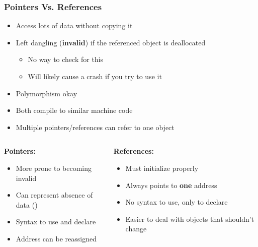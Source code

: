 \documentclass[glossy]{beamer}
\begin{document}
\begin{frame}[fragile=singleslide]
  \frametitle{Pointers Vs. References}

  \begin{itemize}
    \item Access lots of data without copying it
    \item Left dangling (\textbf{invalid}) if the referenced object is deallocated
    \begin{itemize}
      \item No way to check for this
      \item Will likely cause a crash if you try to use it
    \end{itemize}
    \item Polymorphism okay
    \item Both compile to similar machine code
    \item Multiple pointers/references can refer to one object
  \end{itemize}

  \begin{columns}
    \begin{column}{6cm}
      \textbf{Pointers:}
      \begin{itemize}
        \item More prone to becoming invalid
        \item Can represent absence of data ()
        \item Syntax to use and declare
        \item Address can be reassigned
      \end{itemize}
    \end{column}

    \begin{column}{6cm}
      \textbf{References:}
      \begin{itemize}
        \item Must initialize properly
        \item Always points to \textbf{one} address
        \item No syntax to use, only to declare
        \item Easier to deal with objects that shouldn't change
      \end{itemize}
    \end{column}
  \end{columns}
\end{frame}
\end{document}
